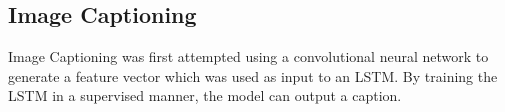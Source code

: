 \subsection{Image Captioning}
Image Captioning was first attempted using a convolutional neural network to generate a feature vector which was used as input to an LSTM.
By training the LSTM in a supervised manner, the model can output a caption.
